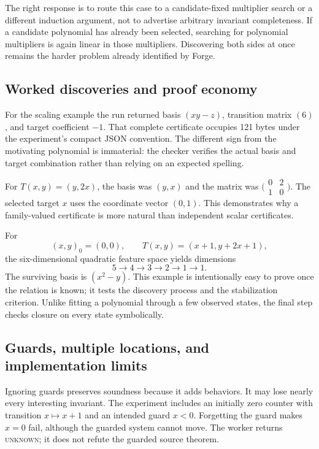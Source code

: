 \documentclass[11pt,letterpaper]{article}
\newcommand{\unknown}{\textsc{unknown}}
\theoremstyle{definition}\newtheorem{definition}[theorem]{Definition}
\theoremstyle{remark}\newtheorem{remark}[theorem]{Remark}
\begin{document}
The right response is to route this case to a candidate-fixed multiplier
search or a different induction argument, not to advertise arbitrary invariant
completeness. If a candidate polynomial has already been selected, searching
for polynomial multipliers is again linear in those multipliers. Discovering
both sides at once remains the harder problem already identified by Forge.

\subsection{Worked discoveries and proof economy}
For the scaling example the run returned basis $(xy-z)$, transition matrix
$(6)$, and target coefficient $-1$. That complete certificate occupies 121
bytes under the experiment's compact JSON convention. The different sign from
the motivating polynomial is immaterial: the checker verifies the actual basis
and target combination rather than relying on an expected spelling.

For $T(x,y)=(y,2x)$, the basis was $(y,x)$ and the matrix was
$\bigl(\begin{smallmatrix}0&2\\1&0\end{smallmatrix}\bigr)$. The selected target
$x$ uses the coordinate vector $(0,1)$. This demonstrates why a family-valued
certificate is more natural than independent scalar certificates.

For
\[
 (x,y)_0=(0,0),\qquad T(x,y)=(x+1,y+2x+1),
\]
the six-dimensional quadratic feature space yields dimensions
\[
 5\longrightarrow4\longrightarrow3\longrightarrow2\longrightarrow1
 \longrightarrow1.
\]
The surviving basis is $(x^2-y)$. This example is intentionally easy to prove
once the relation is known; it tests the discovery process and the stabilization
criterion. Unlike fitting a polynomial through a few observed states, the final
step checks closure on every state symbolically.

\subsection{Guards, multiple locations, and implementation limits}
Ignoring guards preserves soundness because it adds behaviors. It may lose
nearly every interesting invariant. The experiment includes an initially zero
counter with transition $x\mapsto x+1$ and an intended guard $x<0$. Forgetting
the guard makes $x=0$ fail, although the guarded system cannot move. The worker
returns \unknown{}; it does not refute the guarded source theorem.
\end{document}
